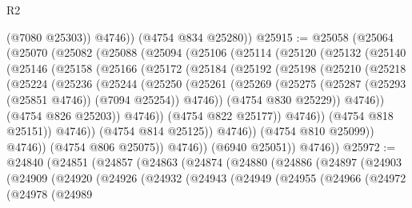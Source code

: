 \begin{lexlean}{R2}
\begin{coremodule}
            (@7080 @25303))
          @4746))
      (@4754 @834 @25280))
@25915 := @25058
    (@25064
      (@25070
        (@25082
          (@25088
            (@25094
              (@25106
                (@25114
                  (@25120
                    (@25132
                      (@25140
                        (@25146
                          (@25158
                            (@25166
                              (@25172
                                (@25184
                                  (@25192
                                    (@25198
                                      (@25210
                                        (@25218
                                          (@25224
                                            (@25236
                                              (@25244
                                                (@25250
                                                  (@25261
                                                    (@25269
                                                      (@25275
                                                        (@25287
                                                          (@25293 (@25851 @4746))
                                                          (@7094 @25254))
                                                        @4746))
                                                    (@4754 @830 @25229))
                                                  @4746))
                                              (@4754 @826 @25203))
                                            @4746))
                                        (@4754 @822 @25177))
                                      @4746))
                                  (@4754 @818 @25151))
                                @4746))
                            (@4754 @814 @25125))
                          @4746))
                      (@4754 @810 @25099))
                    @4746))
                (@4754 @806 @25075))
              @4746))
          (@6940 @25051))
        @4746))
@25972 := @24840
    (@24851
      (@24857
        (@24863
          (@24874
            (@24880
              (@24886
                (@24897
                  (@24903
                    (@24909
                      (@24920
                        (@24926
                          (@24932
                            (@24943
                              (@24949
                                (@24955
                                  (@24966
                                    (@24972
                                      (@24978
                                        (@24989

\end{coremodule}
\end{lexlean}
